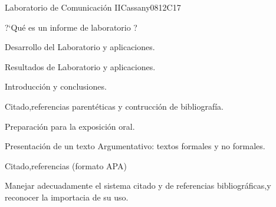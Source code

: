 \begin{syllabus}
\begin{outcomes}
   \item {}
   \item {}
\end{outcomes}

\begin{competences}
    \item {}
    \item {}
    \item {}
\end{competences}

\begin{unit}{Laboratorio de Comunicación II}{}{Cassany08}{12}{C17}
   \begin{topics}
      \item ?`Qué es un informe de laboratorio ?
      \item Desarrollo del Laboratorio y aplicaciones.
      \item Resultados de Laboratorio y aplicaciones.
      \item Introducción y conclusiones.
      \item Citado,referencias parentéticas y contrucción de bibliografía.
      \item Preparación para la exposición oral.
      \item Presentación de un texto Argumentativo: textos formales y  no formales.
      \item Citado,referencias (formato APA)
      
   \end{topics}
\begin{learningoutcomes}
      \item Manejar adecuadamente el sistema citado y de referencias bibliográficas,y reconocer la importacia de su uso.
   \end{learningoutcomes}
\end{unit}

\begin{coursebibliography}
\end{coursebibliography}

\end{syllabus}
